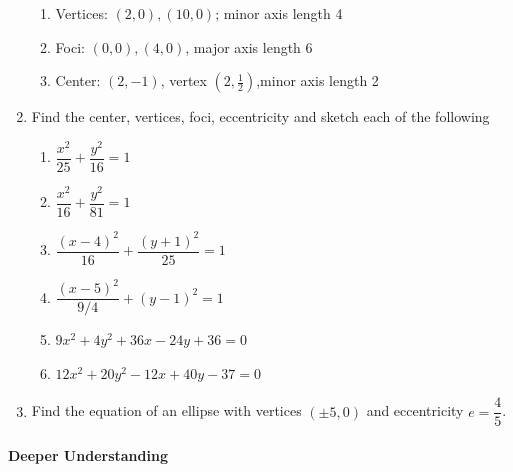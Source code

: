 \documentclass[11pt]{article}
\begin{document}
\begin{enumerate}
\begin{enumerate}
  \item
    Vertices: \((2,0), (10,0)\); minor axis length 4
  \item
    Foci: \((0,0), (4,0)\), major axis length 6
  \item
    Center: \((2,-1)\), vertex \((2,\frac12)\),minor axis length 2
  \end{enumerate}
\item
  Find the center, vertices, foci, eccentricity and sketch each of the following

  \begin{enumerate}

  \item
    \(\dfrac{x^2}{25} + \dfrac{y^2}{16} = 1\)
  \item
    \(\dfrac{x^2}{16} + \dfrac{y^2}{81} = 1\)
  \item
    \(\dfrac{(x-4)^2}{16} + \dfrac{(y+1)^2}{25} = 1\)
  \item
    \(\dfrac{(x-5)^2}{9/4} + (y-1)^2 = 1\)
  \item
    \(9x^2 + 4y^2 + 36x - 24y + 36 = 0\)
  \item
    \(12x^2 + 20y^2 - 12x + 40y - 37 = 0\)
  \end{enumerate}
\item
  Find the equation of an ellipse with vertices \((\pm 5,0)\) and
  eccentricity \(e = \dfrac{4}{5}\).

\end{enumerate}

\hypertarget{deeper-understanding}{%
\paragraph{Deeper Understanding}\label{deeper-understanding}}
\end{document}
